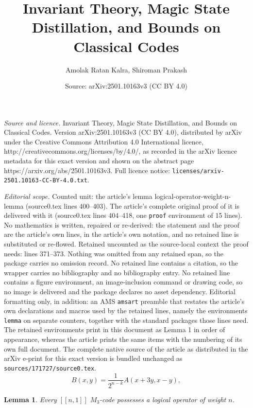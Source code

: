 \documentclass[10pt,a4paper]{amsart}
\title{Invariant Theory, Magic State Distillation, and Bounds on Classical Codes}
\author{Amolak Ratan Kalra, Shiroman Prakash}
\date{Source: arXiv:2501.10163v3 (CC BY 4.0)}
\newtheorem{lemma}{Lemma}
\begin{document}
\maketitle

\noindent\emph{Source and licence.} Invariant Theory, Magic State Distillation, and Bounds on Classical Codes. Version arXiv:2501.10163v3 (CC BY 4.0), distributed by arXiv under the Creative Commons Attribution 4.0 International licence, http://creativecommons.org/licenses/by/4.0/, as recorded in the arXiv licence metadata for this exact version and shown on the abstract page https://arxiv.org/abs/2501.10163v3. Full licence notice: \texttt{licenses/arxiv-2501.10163-CC-BY-4.0.txt}.\par\smallskip

\noindent\textit{Editorial scope.} Counted unit: the article's lemma logical-operator-weight-n-lemma (source0.tex lines 400--403). The article's complete original proof of it is delivered with it (source0.tex lines 404--418, one \texttt{proof} environment of 15 lines). No mathematics is written, repaired or re-derived: the statement and the proof are the article's own lines, in the article's own notation, and no retained line is substituted or re-flowed.  Retained uncounted as the source-local context the proof needs: lines 371--373.  Nothing was omitted from any retained span, so the package carries no omission record.  No retained line contains a citation, so the wrapper carries no bibliography and no bibliography entry.  No retained line contains a figure environment, an image-inclusion command or drawing code, so no image is delivered and the package declares no asset dependency.  Editorial formatting only, in addition: an AMS \texttt{amsart} preamble that restates the article's own declarations and macros used by the retained lines, namely the environments \texttt{lemma} on separate counters, together with the standard packages those lines need.  The retained environments print in this document as Lemma 1 in order of appearance, whereas the article prints the same items with the numbering of its own full document.  The complete native source of the article as distributed in the arXiv e-print for this exact version is bundled unchanged as \texttt{sources/171727/source0.tex}.
\begin{equation}
    B(x,y) = \frac{1}{2^{n-k}} A(x+3y, x-y), \label{eq:classical-macwilliams}
\end{equation}

\begin{lemma}
\label{logical-operator-weight-n-lemma}
Every $[[n,1]]$ $M_3$-code possesses a logical operator of weight $n$.
\end{lemma}
\end{document}
